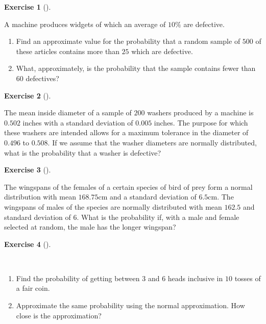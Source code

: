 \documentclass[
  letterpaper,
  DIV=11,
  numbers=noendperiod]{scrreprt}
\providecommand{\tightlist}{%
  \setlength{\itemsep}{0pt}\setlength{\parskip}{0pt}}\usepackage{longtable,booktabs,array}
\theoremstyle{definition}
\newtheorem{exercise}{Exercise}[chapter]
\theoremstyle{definition}
\theoremstyle{definition}
\theoremstyle{remark}
\begin{document}
\begin{exercise}[]\protect\hypertarget{exr-9.2}{}\label{exr-9.2}

A machine produces widgets of which an average of \(10\%\) are
defective.

\begin{enumerate}
\def\labelenumi{\alph{enumi}.}
\tightlist
\item
  Find an approximate value for the probability that a random sample of
  \(500\) of these articles contains more than \(25\) which are
  defective.
\item
  What, approximately, is the probability that the sample contains fewer
  than \(60\) defectives?
\end{enumerate}

\end{exercise}

\begin{exercise}[]\protect\hypertarget{exr-9.3}{}\label{exr-9.3}

The mean inside diameter of a sample of \(200\) washers produced by a
machine is \(0.502\) inches with a standard deviation of \(0.005\)
inches. The purpose for which these washers are intended allows for a
maximum tolerance in the diameter of \(0.496\) to \(0.508\). If we
assume that the washer diameters are normally distributed, what is the
probability that a washer is defective?

\end{exercise}

\begin{exercise}[]\protect\hypertarget{exr-9.4}{}\label{exr-9.4}

The wingspans of the females of a certain species of bird of prey form a
normal distribution with mean \(168.75\)cm and a standard deviation of
\(6.5\)cm. The wingspans of males of the species are normally
distributed with mean \(162.5\) and standard deviation of \(6\). What is
the probability if, with a male and female selected at random, the male
has the longer wingspan?

\end{exercise}

\begin{exercise}[]\protect\hypertarget{exr-9.5}{}\label{exr-9.5}

~

\begin{enumerate}
\def\labelenumi{\alph{enumi}.}
\tightlist
\item
  Find the probability of getting between \(3\) and \(6\) heads
  inclusive in \(10\) tosses of a fair coin.
\item
  Approximate the same probability using the normal approximation. How
  close is the approximation?
\end{enumerate}

\end{exercise}
\end{document}

